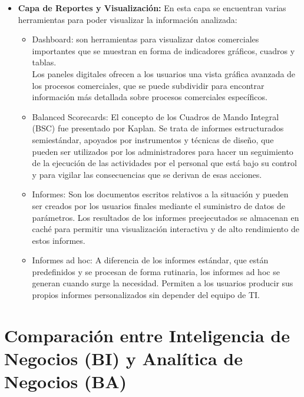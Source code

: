 \documentclass[preprint,12pt]{elsarticle}
\begin{document}
\begin{itemize}
		\item \textbf{Capa de Reportes y Visualización:} En esta capa se encuentran varias herramientas para poder visualizar la información analizada:
		\begin{itemize}
		\item Dashboard: son herramientas para visualizar datos comerciales importantes que se muestran en forma de indicadores gráficos, cuadros y tablas. \\Los paneles digitales ofrecen a los usuarios una vista gráfica avanzada de los procesos comerciales, que se puede subdividir para encontrar información más detallada sobre procesos comerciales específicos.
		\item Balanced Scorecards: El concepto de los Cuadros de Mando Integral (BSC) fue presentado por Kaplan. Se trata de informes estructurados semiestándar, apoyados por instrumentos y técnicas de diseño, que pueden ser utilizados por los administradores para hacer un seguimiento de la ejecución de las actividades por el personal que está bajo su control y para vigilar las consecuencias que se derivan de esas acciones. 
		\item Informes: Son los documentos escritos relativos a la situación y pueden ser creados por los usuarios finales mediante el suministro de datos de parámetros. Los resultados de los informes preejecutados se almacenan en caché para permitir una visualización interactiva y de alto rendimiento de estos informes.
		\item Informes ad hoc: A diferencia de los informes estándar, que están predefinidos y se procesan de forma rutinaria, los informes ad hoc se generan cuando surge la necesidad. Permiten a los usuarios producir sus propios informes personalizados sin depender del equipo de TI.
		\end{itemize}

	\end{itemize}
	


\section{Comparación entre Inteligencia de Negocios (BI) y Analítica de Negocios (BA)}
\end{document}

